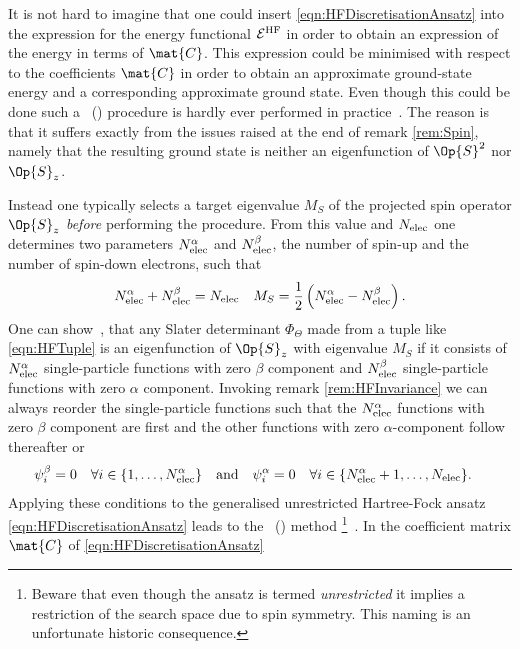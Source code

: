 \begin{rem}
	It is not hard to imagine
	that one could insert \eqref{eqn:HFDiscretisationAnsatz}
	into the expression for the \HF energy functional $\mathcal{E}^\text{HF}$
	in order to obtain an expression of the \HF energy
	in terms of $\mat{C}$.
	This expression could be minimised
	with respect to the coefficients $\mat{C}$
	in order to obtain an approximate
	\HF ground-state energy and a corresponding approximate \HF ground state.
	Even though this could be done
	such a ~(\GUHF)
	procedure is hardly ever performed in practice~\cite{McWeeny1985}.
	The reason is that it suffers
	exactly from the issues raised at the end of remark \vref{rem:Spin},
	namely that the resulting \HF ground state
	is neither an eigenfunction of $\Op{S}^2$ nor $\Op{S}_z$.

	Instead one typically selects a target eigenvalue $M_S$
	of the projected spin operator $\Op{S}_z$ \emph{before}
	performing the \HF procedure.
	From this value and $N_\text{elec}$ one determines two parameters
	$N_\text{elec}^\alpha$ and $N_\text{elec}^\beta$,
	the number of spin-up and the number of spin-down electrons,
	such that
	\begin{align*}
		N_\text{elec}^\alpha + N_\text{elec}^\beta &= N_\text{elec} & M_S = \frac12 \left( N_\text{elec}^\alpha - N_\text{elec}^\beta\right).
	\end{align*}
	One can show~\cite{Szabo1996,Helgaker2013},
	that any Slater determinant $\Phi_\Theta$
	made from a tuple like \eqref{eqn:HFTuple}
	is an eigenfunction of $\Op{S}_z$ with eigenvalue $M_S$
	if it consists of $N_\text{elec}^\alpha$ single-particle functions with zero $\beta$
	component and $N_\text{elec}^\beta$ single-particle functions with zero $\alpha$ component.
	Invoking remark \vref{rem:HFInvariance}
	we can always reorder the single-particle functions
	such that the $N_\text{elec}^\alpha$ functions with zero $\beta$ component are first
	and the other functions with zero $\alpha$-component follow thereafter
	or
	\begin{align*}
		\psi_i^\beta  &= 0 \quad \forall i \in \{1,\ldots,N_\text{elec}^\alpha\}
		&&\text{and}&
		\psi_i^\alpha  &= 0 \quad \forall i \in \{N_\text{elec}^\alpha+1,\ldots,N_\text{elec}\}.
	\end{align*}
	Applying these conditions
	to the generalised unrestricted Hartree-Fock ansatz \eqref{eqn:HFDiscretisationAnsatz}
	leads to the ~(\UHF) method%
	\footnote{
		Beware that even though the \UHF ansatz is termed \emph{unrestricted}
		it implies a restriction of the search space due to spin symmetry.
		This naming is an unfortunate historic consequence.
	}~\cite{Pople1954}.
	In \UHF the coefficient matrix $\mat{C}$ of \eqref{eqn:HFDiscretisationAnsatz}

\end{rem}
